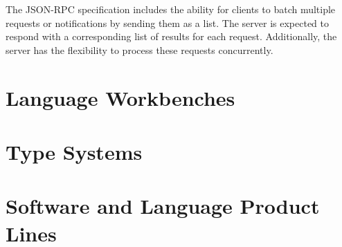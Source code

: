 The JSON-RPC specification includes the ability for clients to batch multiple requests or notifications by sending them as a list. The server is expected to respond with a corresponding list of results for each request. Additionally, the server has the flexibility to process these requests concurrently.

\section{Language Workbenches}\label{sec:LanguageWorkbenches}

\section{Type Systems}\label{sec:TypeSystems}

\section{Software and Language Product Lines}\label{sec:SoftwareProductLines}
